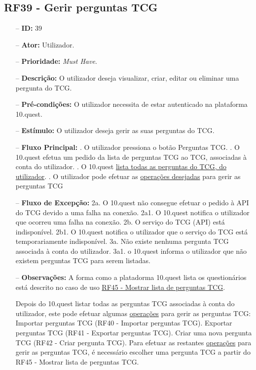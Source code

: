 \subsection{RF39 - Gerir perguntas TCG}
\begin{itemize}
	\item[--] \textbf{ID:} 39
	\item[--]  \textbf{Ator:} Utilizador.
	\item[--]  \textbf{Prioridade:} \textit{Must Have}.
	\item[--]  \textbf{Descrição:} O utilizador deseja visualizar, criar, editar ou eliminar uma pergunta do TCG.
	\item[--]  \textbf{Pré-condições:} O utilizador necessita de estar autenticado na plataforma 10.quest.
	\item[--]  \textbf{Estímulo:} O utilizador deseja gerir as suas perguntas do TCG.
	\item[--]  \textbf{Fluxo Principal:} 
		. O utilizador pressiona o botão Perguntas TCG.
		. O 10.quest efetua um pedido da lista de perguntas TCG ao TCG, associadas à conta do utilizador.
		. O 10.quest  \underline{lista todas as perguntas do TCG, do utilizador}.
		. O utilizador pode efetuar as \underline{operações desejadas} para gerir as perguntas TCG
	\item[--]  \textbf{Fluxo de Excepção:} 
		\subitem 2a. O 10.quest não consegue efetuar o pedido à API do TCG devido a uma falha na conexão.
		\subitem 2a1. O 10.quest notifica o utilizador que ocorreu uma falha na conexão.
		\subitem 2b. O serviço do TCG (API) está indisponível.
		\subitem 2b1. O 10.quest notifica o utilizador que o serviço do TCG está temporariamente indisponível. 
		\subitem 3a. Não existe nenhuma pergunta TCG associada à conta do utilizador.
		\subitem 3a1. o 10.quest informa o utilizador que não existem perguntas TCG para serem listadas.
	\item[--]  \textbf{Observações:} A forma como a platadorma 10.quest lista os questionários está descrito no caso de uso \underline{RF45 - Mostrar lista de perguntas TCG}.
	
	Depois do 10.quest listar todas as perguntas TCG associadas à conta do utilizador, este pode efetuar algumas \underline{operações} para gerir as perguntas TCG:
		\subitem Importar perguntas TCG (RF40 - Importar perguntas TCG).
		\subitem Exportar perguntas TCG (RF41 - Exportar perguntas TCG).
		\subitem Criar uma nova pergunta TCG (RF42 - Criar pergunta TCG).
	Para efetuar as restantes \underline{operações}  para gerir as perguntas TCG, é necessário escolher uma pergunta TCG a partir do RF45 - Mostrar lista de perguntas TCG.
\end{itemize}
\newpage

